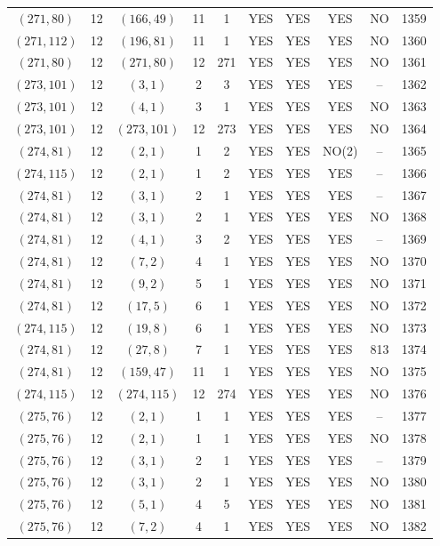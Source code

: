 \begin{longtable}{|c|c|c|c|c|c|c|c|c|c|}
$(271, 80)$ & 12 & $(166, 49)$ & 11 & 1 & YES & YES & YES & NO & 1359\\
$(271, 112)$ & 12 & $(196, 81)$ & 11 & 1 & YES & YES & YES & NO & 1360\\
$(271, 80)$ & 12 & $(271, 80)$ & 12 & 271 & YES & YES & YES & NO & 1361\\
$(273, 101)$ & 12 & $(3, 1)$ & 2 & 3 & YES & YES & YES & -- & 1362\\
$(273, 101)$ & 12 & $(4, 1)$ & 3 & 1 & YES & YES & YES & NO & 1363\\
$(273, 101)$ & 12 & $(273, 101)$ & 12 & 273 & YES & YES & YES & NO & 1364\\
$(274, 81)$ & 12 & $(2, 1)$ & 1 & 2 & YES & YES & NO(2) & -- & 1365\\
$(274, 115)$ & 12 & $(2, 1)$ & 1 & 2 & YES & YES & YES & -- & 1366\\
$(274, 81)$ & 12 & $(3, 1)$ & 2 & 1 & YES & YES & YES & -- & 1367\\
$(274, 81)$ & 12 & $(3, 1)$ & 2 & 1 & YES & YES & YES & NO & 1368\\
$(274, 81)$ & 12 & $(4, 1)$ & 3 & 2 & YES & YES & YES & -- & 1369\\
$(274, 81)$ & 12 & $(7, 2)$ & 4 & 1 & YES & YES & YES & NO & 1370\\
$(274, 81)$ & 12 & $(9, 2)$ & 5 & 1 & YES & YES & YES & NO & 1371\\
$(274, 81)$ & 12 & $(17, 5)$ & 6 & 1 & YES & YES & YES & NO & 1372\\
$(274, 115)$ & 12 & $(19, 8)$ & 6 & 1 & YES & YES & YES & NO & 1373\\
$(274, 81)$ & 12 & $(27, 8)$ & 7 & 1 & YES & YES & YES & 813 & 1374\\
$(274, 81)$ & 12 & $(159, 47)$ & 11 & 1 & YES & YES & YES & NO & 1375\\
$(274, 115)$ & 12 & $(274, 115)$ & 12 & 274 & YES & YES & YES & NO & 1376\\
$(275, 76)$ & 12 & $(2, 1)$ & 1 & 1 & YES & YES & YES & -- & 1377\\
$(275, 76)$ & 12 & $(2, 1)$ & 1 & 1 & YES & YES & YES & NO & 1378\\
$(275, 76)$ & 12 & $(3, 1)$ & 2 & 1 & YES & YES & YES & -- & 1379\\
$(275, 76)$ & 12 & $(3, 1)$ & 2 & 1 & YES & YES & YES & NO & 1380\\
$(275, 76)$ & 12 & $(5, 1)$ & 4 & 5 & YES & YES & YES & NO & 1381\\
$(275, 76)$ & 12 & $(7, 2)$ & 4 & 1 & YES & YES & YES & NO & 1382\\

\end{longtable}
